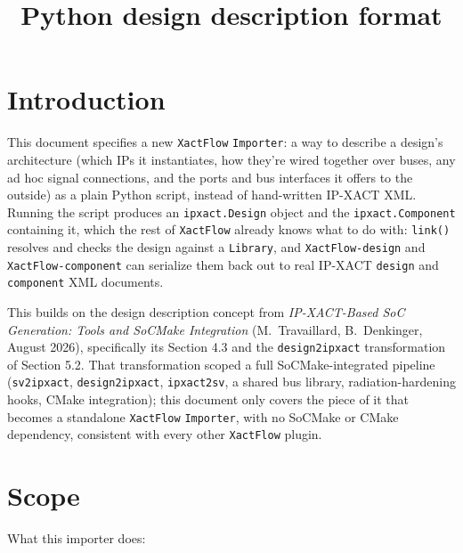 \documentclass[11pt]{article}
\title{Python design description format}
\author{}
\date{}
\newcommand{\code}[1]{\texttt{#1}}
\begin{document}
\maketitle

\tableofcontents

\section{Introduction}

This document specifies a new \code{XactFlow} \code{Importer}: a way to describe a
design's architecture (which IPs it instantiates, how they're wired together over buses,
any ad hoc signal connections, and the ports and bus interfaces it offers to the outside)
as a plain Python script, instead of hand-written IP-XACT XML. Running the script produces
an \code{ipxact.Design} object and the \code{ipxact.Component} containing it, which the
rest of \code{XactFlow} already knows what to do with: \code{link()} resolves and checks
the design against a \code{Library}, and \code{XactFlow-design} and
\code{XactFlow-component} can serialize them back out to real IP-XACT \code{design} and
\code{component} XML documents.

This builds on the design description concept from \emph{IP-XACT-Based SoC Generation:
Tools and SoCMake Integration} (M.~Travaillard, B.~Denkinger, August 2026), specifically
its Section 4.3 and the \code{design2ipxact} transformation of Section 5.2. That transformation
scoped a full SoCMake-integrated pipeline (\code{sv2ipxact}, \code{design2ipxact},
\code{ipxact2sv}, a shared bus library, radiation-hardening hooks, CMake integration);
this document only covers the piece of it that becomes a standalone \code{XactFlow}
\code{Importer}, with no SoCMake or CMake dependency, consistent with every other
\code{XactFlow} plugin.

\section{Scope}

What this importer does:
\end{document}
